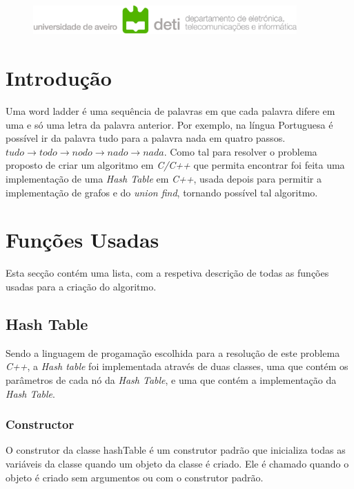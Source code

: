 \documentclass[a4paper,11pt]{article}
\title{}
\author{
    André Cardoso 50\%\\
    andremacardoso@ua.pt\\
    108269\\
    \and
    Tiago Figueiredo 50\%\\
    tiago.a.figueiredo@ua.pt\\
    107263\\
}
\date{09 de Janeiro de 2023}
\begin{document}
    \begin{figure}
        \centering
        \includegraphics[width=0.9\textwidth]{deti2}\label{fig:figure}
    \end{figure}
    \maketitle
    \tableofcontents
    \clearpage


    \section{Introdução}\label{sec:introducao}
Uma word ladder é uma sequência de palavras em que cada palavra difere em uma e só uma letra da palavra anterior.
Por exemplo, na língua Portuguesa é possível ir da palavra tudo para a palavra nada em quatro passos.
\emph{$tudo \rightarrow todo \rightarrow nodo \rightarrow nado \rightarrow nada$}.
Como tal para resolver o problema proposto de criar um algoritmo em \emph{C/C++} que permita encontrar foi feita uma implementação de uma \emph{Hash Table} em \emph{C++}, usada depois para permitir a implementação de grafos e do \emph{union find}, tornando possível tal algoritmo.

    \section{Funções Usadas}\label{sec:funcoes-usadas}
    Esta secção contém uma lista, com a respetiva descrição de todas as funções usadas para a criação do algoritmo.

    \subsection{Hash Table}\label{subsec:hash-table}
    Sendo a linguagem de progamação escolhida para a resolução de este problema \emph{C++}, a \emph{Hash table} foi implementada através de duas classes, uma que contém os parâmetros de cada nó da \emph{Hash Table}, e uma que contém a implementação da \emph{Hash Table}.

    \subsubsection{Constructor}
    O construtor da classe hashTable é um construtor padrão que inicializa todas as variáveis da classe quando um objeto da classe é criado. Ele é chamado quando o objeto é criado sem argumentos ou com o construtor padrão.
\end{document}
